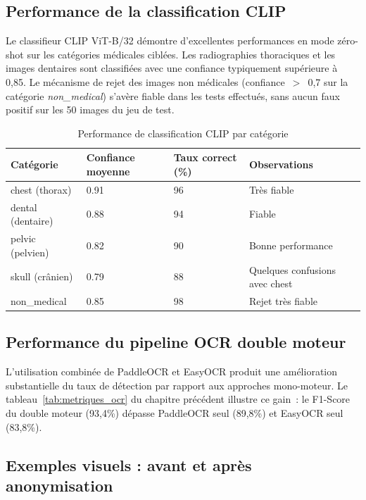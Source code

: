 \subsection{Performance de la classification CLIP}

Le classifieur CLIP ViT-B/32 démontre d'excellentes performances en mode zéro-shot sur les catégories médicales ciblées. Les radiographies thoraciques et les images dentaires sont classifiées avec une confiance typiquement supérieure à 0,85. Le mécanisme de rejet des images non médicales (confiance~$>$~0,7 sur la catégorie \textit{non\_medical}) s'avère fiable dans les tests effectués, sans aucun faux positif sur les 50 images du jeu de test.

\begin{table}[H]
\centering
\caption{Performance de classification CLIP par catégorie}
\label{tab:perf_clip}
\begin{tabularx}{\textwidth}{p{3.5cm} p{3cm} p{3cm} p{4cm}}
\toprule
\textbf{Catégorie} & \textbf{Confiance moyenne} & \textbf{Taux correct (\%)} & \textbf{Observations} \\
\midrule
chest (thorax)    & 0.91 & 96 & Très fiable \\
dental (dentaire) & 0.88 & 94 & Fiable \\
pelvic (pelvien)  & 0.82 & 90 & Bonne performance \\
skull (crânien)   & 0.79 & 88 & Quelques confusions avec chest \\
non\_medical      & 0.85 & 98 & Rejet très fiable \\
\bottomrule
\end{tabularx}
\end{table}

\subsection{Performance du pipeline OCR double moteur}

L'utilisation combinée de PaddleOCR et EasyOCR produit une amélioration substantielle du taux de détection par rapport aux approches mono-moteur. Le tableau~\ref{tab:metriques_ocr} du chapitre précédent illustre ce gain~: le F1-Score du double moteur (93,4\%) dépasse PaddleOCR seul (89,8\%) et EasyOCR seul (83,8\%).

\subsection{Exemples visuels : avant et après anonymisation}

